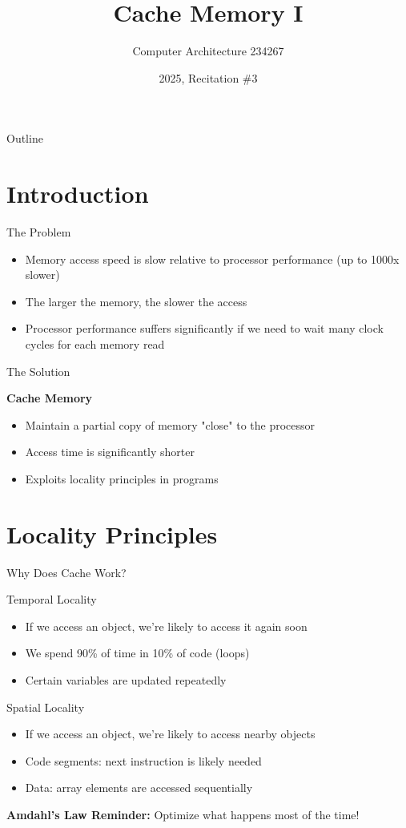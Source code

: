 \documentclass[aspectratio=169,12pt]{beamer}
\title{Cache Memory I}
\author{Computer Architecture 234267}
\date{2025, Recitation \#3}
\begin{document}
\frame{\titlepage}

\begin{frame}{Outline}
\tableofcontents
\end{frame}

\section{Introduction}
\begin{frame}{The Problem}
\begin{itemize}
    \item Memory access speed is slow relative to processor performance (up to 1000x slower)
    \item The larger the memory, the slower the access
    \item Processor performance suffers significantly if we need to wait many clock cycles for each memory read
\end{itemize}
\end{frame}

\begin{frame}{The Solution}
\begin{center}
\textbf{Cache Memory}
\end{center}
\begin{itemize}
    \item Maintain a partial copy of memory "close" to the processor
    \item Access time is significantly shorter
    \item Exploits locality principles in programs
\end{itemize}
\end{frame}

\section{Locality Principles}
\begin{frame}{Why Does Cache Work?}
\begin{block}{Temporal Locality}
\begin{itemize}
    \item If we access an object, we're likely to access it again soon
    \item We spend 90\% of time in 10\% of code (loops)
    \item Certain variables are updated repeatedly
\end{itemize}
\end{block}

\begin{block}{Spatial Locality}
\begin{itemize}
    \item If we access an object, we're likely to access nearby objects
    \item Code segments: next instruction is likely needed
    \item Data: array elements are accessed sequentially
\end{itemize}
\end{block}

\textbf{Amdahl's Law Reminder:} Optimize what happens most of the time!
\end{frame}
\end{document}

